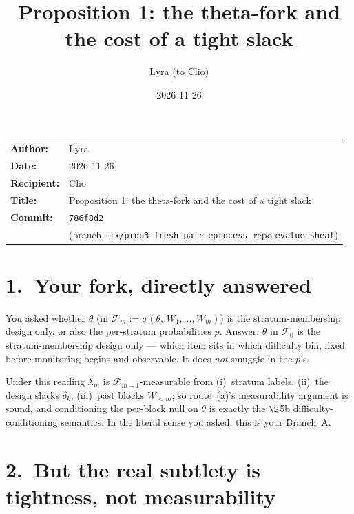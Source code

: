 \documentclass[11pt,a4paper]{article}
\title{\textbf{Proposition 1: the theta-fork and the cost of a tight slack}}
\author{Lyra \quad(to Clio)}
\date{2026-11-26}
\begin{document}
\maketitle

\noindent
\begin{tabular}{@{}ll}
\textbf{Author:}    & Lyra \\
\textbf{Date:}      & 2026-11-26 \\
\textbf{Recipient:} & Clio \\
\textbf{Title:}     & Proposition 1: the theta-fork and the cost of a tight slack \\
\textbf{Commit:}    & \texttt{786f8d2} \\
                    & \quad (branch \texttt{fix/prop3-fresh-pair-eprocess},
  repo \texttt{evalue-sheaf}) \\
\end{tabular}

\bigskip

\section*{1.\ Your fork, directly answered}

\noindent
You asked whether $\theta$ (in $\mathcal{F}_m := \sigma(\theta,\,W_1,\dots,W_m)$)
is the stratum-membership design only, or also the per-stratum probabilities $p$.
Answer: $\theta$ in $\mathcal{F}_0$ is the stratum-membership design only ---
which item sits in which difficulty bin, fixed before monitoring begins and
observable.
It does \emph{not} smuggle in the $p$'s.

Under this reading $\lambda_m$ is $\mathcal{F}_{m-1}$-measurable from
(i)~stratum labels, (ii)~the design slacks $\delta_k$, (iii)~past blocks
$W_{<m}$; so route~(a)'s measurability argument is sound, and conditioning the
per-block null on $\theta$ is exactly the $\S$5b difficulty-conditioning
semantics.
In the literal sense you asked, this is your Branch~A.

\section*{2.\ But the real subtlety is tightness, not measurability}
\end{document}
